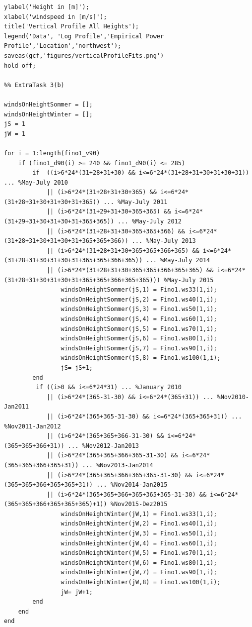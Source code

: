 \documentclass[10pt]{article}
\begin{document}
\begin{lstlisting}
ylabel('Height in [m]');
xlabel('windspeed in [m/s]');
title('Vertical Profile All Heights');
legend('Data', 'Log Profile','Empirical Power Profile','Location','northwest');
saveas(gcf,'figures/verticalProfileFits.png')
hold off;

%% ExtraTask 3(b)

windsOnHeightSommer = [];
windsOnHeightWinter = [];
jS = 1
jW = 1

for i = 1:length(fino1_v90)
    if (fino1_d90(i) >= 240 && fino1_d90(i) <= 285) 
        if  ((i>6*24*(31+28+31+30) && i<=6*24*(31+28+31+30+31+30+31)) ... %May-July 2010
            || (i>6*24*(31+28+31+30+365) && i<=6*24*(31+28+31+30+31+30+31+365)) ... %May-July 2011
            || (i>6*24*(31+29+31+30+365+365) && i<=6*24*(31+29+31+30+31+30+31+365+365)) ... %May-July 2012
            || (i>6*24*(31+28+31+30+365+365+366) && i<=6*24*(31+28+31+30+31+30+31+365+365+366)) ... %May-July 2013
            || (i>6*24*(31+28+31+30+365+365+366+365) && i<=6*24*(31+28+31+30+31+30+31+365+365+366+365)) ... %May-July 2014
            || (i>6*24*(31+28+31+30+365+365+366+365+365) && i<=6*24*(31+28+31+30+31+30+31+365+365+366+365+365))) %May-July 2015
                windsOnHeightSommer(jS,1) = Fino1.ws33(1,i);
                windsOnHeightSommer(jS,2) = Fino1.ws40(1,i);
                windsOnHeightSommer(jS,3) = Fino1.ws50(1,i);
                windsOnHeightSommer(jS,4) = Fino1.ws60(1,i);
                windsOnHeightSommer(jS,5) = Fino1.ws70(1,i);
                windsOnHeightSommer(jS,6) = Fino1.ws80(1,i);
                windsOnHeightSommer(jS,7) = Fino1.ws90(1,i);
                windsOnHeightSommer(jS,8) = Fino1.ws100(1,i);
                jS= jS+1;
        end
         if ((i>0 && i<=6*24*31) ... %January 2010
            || (i>6*24*(365-31-30) && i<=6*24*(365+31)) ... %Nov2010-Jan2011
            || (i>6*24*(365+365-31-30) && i<=6*24*(365+365+31)) ... %Nov2011-Jan2012
            || (i>6*24*(365+365+366-31-30) && i<=6*24*(365+365+366+31)) ... %Nov2012-Jan2013
            || (i>6*24*(365+365+366+365-31-30) && i<=6*24*(365+365+366+365+31)) ... %Nov2013-Jan2014
            || (i>6*24*(365+365+366+365+365-31-30) && i<=6*24*(365+365+366+365+365+31)) ... %Nov2014-Jan2015
            || (i>6*24*(365+365+366+365+365+365-31-30) && i<=6*24*(365+365+366+365+365+365)+1)) %Nov2015-Dez2015
                windsOnHeightWinter(jW,1) = Fino1.ws33(1,i);
                windsOnHeightWinter(jW,2) = Fino1.ws40(1,i);
                windsOnHeightWinter(jW,3) = Fino1.ws50(1,i);
                windsOnHeightWinter(jW,4) = Fino1.ws60(1,i);
                windsOnHeightWinter(jW,5) = Fino1.ws70(1,i);
                windsOnHeightWinter(jW,6) = Fino1.ws80(1,i);
                windsOnHeightWinter(jW,7) = Fino1.ws90(1,i);
                windsOnHeightWinter(jW,8) = Fino1.ws100(1,i);
                jW= jW+1;
        end
    end
end


\end{lstlisting}
\end{document}
